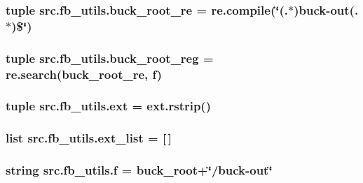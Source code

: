 \hypertarget{namespacesrc_1_1fb__utils_aa9db9d7eca83e9593edbe27a7f90fe32}{
\subsubsection[{buck\-\_\-root\-\_\-re}]{\setlength{\rightskip}{0pt plus 5cm}tuple src.\-fb\-\_\-utils.\-buck\-\_\-root\-\_\-re = re.\-compile(\char`\"{}(.$\ast$)buck-\/out(.$\ast$)\$\char`\"{})}}\label{namespacesrc_1_1fb__utils_aa9db9d7eca83e9593edbe27a7f90fe32}
\hypertarget{namespacesrc_1_1fb__utils_a678c407157c5d26ec8e3e6e4b96ba183}{
\subsubsection[{buck\-\_\-root\-\_\-reg}]{\setlength{\rightskip}{0pt plus 5cm}tuple src.\-fb\-\_\-utils.\-buck\-\_\-root\-\_\-reg = re.\-search({\bf buck\-\_\-root\-\_\-re}, {\bf f})}}\label{namespacesrc_1_1fb__utils_a678c407157c5d26ec8e3e6e4b96ba183}
\hypertarget{namespacesrc_1_1fb__utils_a95107e9cf9c2d3e1d3f48e33b739553f}{
\subsubsection[{ext}]{\setlength{\rightskip}{0pt plus 5cm}tuple src.\-fb\-\_\-utils.\-ext = ext.\-rstrip()}}\label{namespacesrc_1_1fb__utils_a95107e9cf9c2d3e1d3f48e33b739553f}
\hypertarget{namespacesrc_1_1fb__utils_ab692d5d23bd1968e764276e3fb43b566}{
\subsubsection[{ext\-\_\-list}]{\setlength{\rightskip}{0pt plus 5cm}list src.\-fb\-\_\-utils.\-ext\-\_\-list = \mbox{[}$\,$\mbox{]}}}\label{namespacesrc_1_1fb__utils_ab692d5d23bd1968e764276e3fb43b566}
\hypertarget{namespacesrc_1_1fb__utils_a43a093e426256f2ab545fa87abf33416}{
\subsubsection[{f}]{\setlength{\rightskip}{0pt plus 5cm}string src.\-fb\-\_\-utils.\-f = {\bf buck\-\_\-root}+\char`\"{}/buck-\/out\char`\"{}}}\label{namespacesrc_1_1fb__utils_a43a093e426256f2ab545fa87abf33416}
